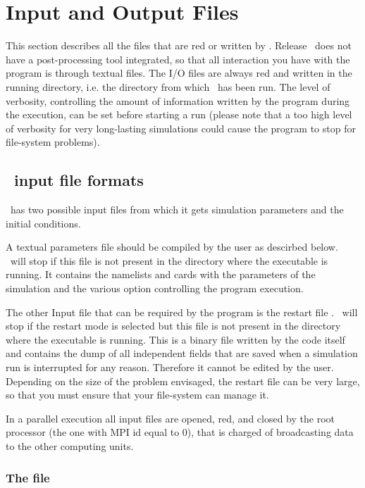 \section{Input and Output Files}
\label{section:files}

This section describes all the files that are red or written by \PDAC.
Release \PDACVERSION\ does not have a post-processing tool integrated,
so that all interaction you have with the program is through textual files.
The I/O files are always red and written in the running directory,
i.e. the directory from which \PDAC\ has been run.
The level of verbosity, controlling the amount of information written
by the program during the execution, can be set before starting a run
(please note that a too high level of verbosity for very long-lasting 
simulations could cause the program to stop for file-system problems).

\subsection{\PDAC\ input file formats}
\label{section:input_files}

\PDAC\ has two possible input files from which it gets simulation parameters
and the initial conditions. 

A textual parameters file  should be compiled by the user
as descirbed below.  \PDAC\ will stop if this file is not present in the 
directory where the executable is running.
It contains the namelists and cards with the parameters of the simulation
and the various option controlling the program execution.

The other Input file that can be required by the program is the restart
file . 
\PDAC\ will stop if the restart mode is selected but this file is not present 
in the directory where the executable is running.
This is a binary file written by the code itself and
contains the dump of all independent fields that are saved when a
simulation run is interrupted for any reason. Therefore it cannot be edited by 
the user. Depending on the size of the problem envisaged, the restart file can 
be very large, so that you must ensure that your file-system can manage it.

In a parallel execution all input files are opened, red, and closed
by the root processor (the one with MPI id equal to 0), that
is charged of broadcasting data to the other computing units.

\subsubsection{The  file}
\label{section:padc_dat}

